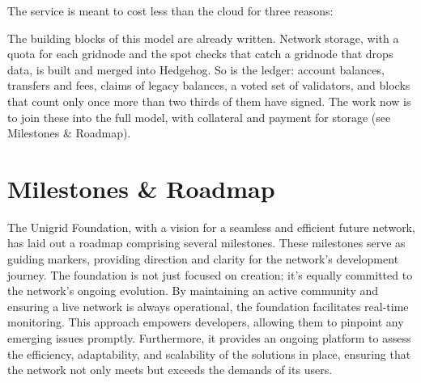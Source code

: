 \documentclass[a4paper,oneside]{article}
\begin{document}
The service is meant to cost less than the cloud for three reasons:

\begin{center}
\end{center}

The building blocks of this model are already written. Network storage, with a quota for each gridnode and the spot checks that catch a gridnode that drops data, is built and merged into Hedgehog. So is the ledger: account balances, transfers and fees, claims of legacy balances, a voted set of validators, and blocks that count only once more than two thirds of them have signed. The work now is to join these into the full model, with collateral and payment for storage (see Milestones \& Roadmap).

\section{Milestones \& Roadmap}
The Unigrid Foundation, with a vision for a seamless and efficient future network, has laid out a roadmap comprising several milestones. These milestones serve as guiding markers, providing direction and clarity for the network's development journey. The foundation is not just focused on creation; it's equally committed to the network's ongoing evolution. By maintaining an active community and ensuring a live network is always operational, the foundation facilitates real-time monitoring. This approach empowers developers, allowing them to pinpoint any emerging issues promptly. Furthermore, it provides an ongoing platform to assess the efficiency, adaptability, and scalability of the solutions in place, ensuring that the network not only meets but exceeds the demands of its users.
\end{document}
